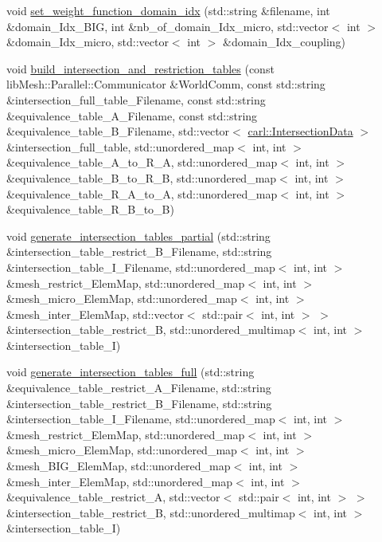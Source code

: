\begin{DoxyCompactItemize}
\item 
void \hyperlink{namespacecarl_aab1c0aca80d848937579e63a21c9a270}{set\+\_\+weight\+\_\+function\+\_\+domain\+\_\+idx} (std\+::string \&filename, int \&domain\+\_\+\+Idx\+\_\+\+B\+I\+G, int \&nb\+\_\+of\+\_\+domain\+\_\+\+Idx\+\_\+micro, std\+::vector$<$ int $>$ \&domain\+\_\+\+Idx\+\_\+micro, std\+::vector$<$ int $>$ \&domain\+\_\+\+Idx\+\_\+coupling)
\item 
void \hyperlink{namespacecarl_ada178344184a369ba2db2926999a7446}{build\+\_\+intersection\+\_\+and\+\_\+restriction\+\_\+tables} (const lib\+Mesh\+::\+Parallel\+::\+Communicator \&World\+Comm, const std\+::string \&intersection\+\_\+full\+\_\+table\+\_\+\+Filename, const std\+::string \&equivalence\+\_\+table\+\_\+\+A\+\_\+\+Filename, const std\+::string \&equivalence\+\_\+table\+\_\+\+B\+\_\+\+Filename, std\+::vector$<$ \hyperlink{structcarl_1_1_intersection_data}{carl\+::\+Intersection\+Data} $>$ \&intersection\+\_\+full\+\_\+table, std\+::unordered\+\_\+map$<$ int, int $>$ \&equivalence\+\_\+table\+\_\+\+A\+\_\+to\+\_\+\+R\+\_\+\+A, std\+::unordered\+\_\+map$<$ int, int $>$ \&equivalence\+\_\+table\+\_\+\+B\+\_\+to\+\_\+\+R\+\_\+\+B, std\+::unordered\+\_\+map$<$ int, int $>$ \&equivalence\+\_\+table\+\_\+\+R\+\_\+\+A\+\_\+to\+\_\+\+A, std\+::unordered\+\_\+map$<$ int, int $>$ \&equivalence\+\_\+table\+\_\+\+R\+\_\+\+B\+\_\+to\+\_\+\+B)
\item 
void \hyperlink{namespacecarl_a8aedfd6e81c99d9651093ff26b9c5a55}{generate\+\_\+intersection\+\_\+tables\+\_\+partial} (std\+::string \&intersection\+\_\+table\+\_\+restrict\+\_\+\+B\+\_\+\+Filename, std\+::string \&intersection\+\_\+table\+\_\+\+I\+\_\+\+Filename, std\+::unordered\+\_\+map$<$ int, int $>$ \&mesh\+\_\+restrict\+\_\+\+Elem\+Map, std\+::unordered\+\_\+map$<$ int, int $>$ \&mesh\+\_\+micro\+\_\+\+Elem\+Map, std\+::unordered\+\_\+map$<$ int, int $>$ \&mesh\+\_\+inter\+\_\+\+Elem\+Map, std\+::vector$<$ std\+::pair$<$ int, int $>$ $>$ \&intersection\+\_\+table\+\_\+restrict\+\_\+\+B, std\+::unordered\+\_\+multimap$<$ int, int $>$ \&intersection\+\_\+table\+\_\+\+I)
\item 
void \hyperlink{namespacecarl_ac207572d2bb1b2f6558bbb96bfa89edc}{generate\+\_\+intersection\+\_\+tables\+\_\+full} (std\+::string \&equivalence\+\_\+table\+\_\+restrict\+\_\+\+A\+\_\+\+Filename, std\+::string \&intersection\+\_\+table\+\_\+restrict\+\_\+\+B\+\_\+\+Filename, std\+::string \&intersection\+\_\+table\+\_\+\+I\+\_\+\+Filename, std\+::unordered\+\_\+map$<$ int, int $>$ \&mesh\+\_\+restrict\+\_\+\+Elem\+Map, std\+::unordered\+\_\+map$<$ int, int $>$ \&mesh\+\_\+micro\+\_\+\+Elem\+Map, std\+::unordered\+\_\+map$<$ int, int $>$ \&mesh\+\_\+\+B\+I\+G\+\_\+\+Elem\+Map, std\+::unordered\+\_\+map$<$ int, int $>$ \&mesh\+\_\+inter\+\_\+\+Elem\+Map, std\+::unordered\+\_\+map$<$ int, int $>$ \&equivalence\+\_\+table\+\_\+restrict\+\_\+\+A, std\+::vector$<$ std\+::pair$<$ int, int $>$ $>$ \&intersection\+\_\+table\+\_\+restrict\+\_\+\+B, std\+::unordered\+\_\+multimap$<$ int, int $>$ \&intersection\+\_\+table\+\_\+\+I)

\end{DoxyCompactItemize}
